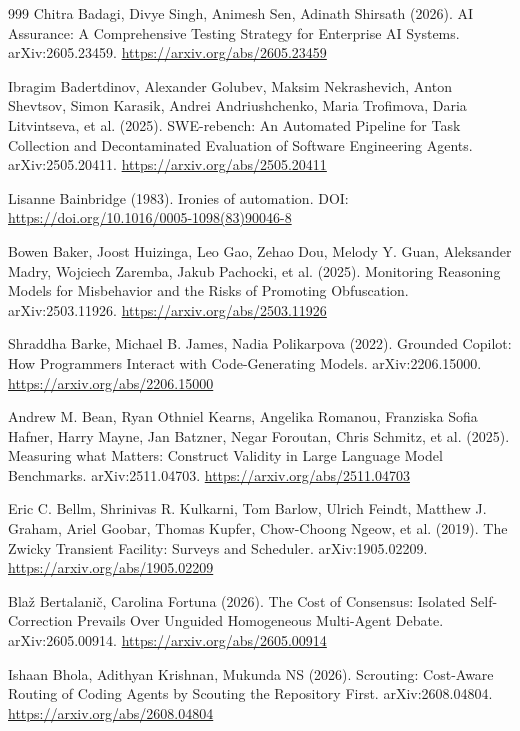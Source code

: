 \begin{thebibliography}{999}
 Chitra Badagi, Divye Singh, Animesh Sen, Adinath Shirsath (2026). AI Assurance: A Comprehensive Testing Strategy for Enterprise AI Systems. arXiv:2605.23459. \url{https://arxiv.org/abs/2605.23459}

 Ibragim Badertdinov, Alexander Golubev, Maksim Nekrashevich, Anton Shevtsov, Simon Karasik, Andrei Andriushchenko, Maria Trofimova, Daria Litvintseva, et al. (2025). SWE-rebench: An Automated Pipeline for Task Collection and Decontaminated Evaluation of Software Engineering Agents. arXiv:2505.20411. \url{https://arxiv.org/abs/2505.20411}

 Lisanne Bainbridge (1983). Ironies of automation. DOI: \url{https://doi.org/10.1016/0005-1098(83)90046-8}

 Bowen Baker, Joost Huizinga, Leo Gao, Zehao Dou, Melody Y. Guan, Aleksander Madry, Wojciech Zaremba, Jakub Pachocki, et al. (2025). Monitoring Reasoning Models for Misbehavior and the Risks of Promoting Obfuscation. arXiv:2503.11926. \url{https://arxiv.org/abs/2503.11926}

 Shraddha Barke, Michael B. James, Nadia Polikarpova (2022). Grounded Copilot: How Programmers Interact with Code-Generating Models. arXiv:2206.15000. \url{https://arxiv.org/abs/2206.15000}

 Andrew M. Bean, Ryan Othniel Kearns, Angelika Romanou, Franziska Sofia Hafner, Harry Mayne, Jan Batzner, Negar Foroutan, Chris Schmitz, et al. (2025). Measuring what Matters: Construct Validity in Large Language Model Benchmarks. arXiv:2511.04703. \url{https://arxiv.org/abs/2511.04703}

 Eric C. Bellm, Shrinivas R. Kulkarni, Tom Barlow, Ulrich Feindt, Matthew J. Graham, Ariel Goobar, Thomas Kupfer, Chow-Choong Ngeow, et al. (2019). The Zwicky Transient Facility: Surveys and Scheduler. arXiv:1905.02209. \url{https://arxiv.org/abs/1905.02209}

 Bla\v{z} Bertalani\v{c}, Carolina Fortuna (2026). The Cost of Consensus: Isolated Self-Correction Prevails Over Unguided Homogeneous Multi-Agent Debate. arXiv:2605.00914. \url{https://arxiv.org/abs/2605.00914}

 Ishaan Bhola, Adithyan Krishnan, Mukunda NS (2026). Scrouting: Cost-Aware Routing of Coding Agents by Scouting the Repository First. arXiv:2608.04804. \url{https://arxiv.org/abs/2608.04804}


\end{thebibliography}
